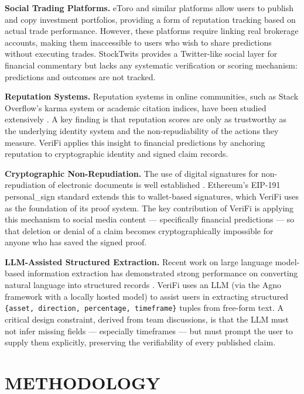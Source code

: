 \documentclass[a4paper,12pt]{report}
\begin{document}
\textbf{Social Trading Platforms.} eToro and similar platforms allow users to publish and copy investment portfolios, providing a form of reputation tracking based on actual trade performance. However, these platforms require linking real brokerage accounts, making them inaccessible to users who wish to share predictions without executing trades. StockTwits provides a Twitter-like social layer for financial commentary but lacks any systematic verification or scoring mechanism: predictions and outcomes are not tracked.

\textbf{Reputation Systems.} Reputation systems in online communities, such as Stack Overflow's karma system or academic citation indices, have been studied extensively \cite{josang2007}. A key finding is that reputation scores are only as trustworthy as the underlying identity system and the non-repudiability of the actions they measure. VeriFi applies this insight to financial predictions by anchoring reputation to cryptographic identity and signed claim records.

\textbf{Cryptographic Non-Repudiation.} The use of digital signatures for non-repudiation of electronic documents is well established \cite{johnson2001}. Ethereum's EIP-191 personal\_sign standard \cite{eip191} extends this to wallet-based signatures, which VeriFi uses as the foundation of its proof system. The key contribution of VeriFi is applying this mechanism to social media content --- specifically financial predictions --- so that deletion or denial of a claim becomes cryptographically impossible for anyone who has saved the signed proof.

\textbf{LLM-Assisted Structured Extraction.} Recent work on large language model-based information extraction has demonstrated strong performance on converting natural language into structured records \cite{wei2022}. VeriFi uses an LLM (via the Agno framework with a locally hosted model) to assist users in extracting structured \texttt{\{asset, direction, percentage, timeframe\}} tuples from free-form text. A critical design constraint, derived from team discussions, is that the LLM must not infer missing fields --- especially timeframes --- but must prompt the user to supply them explicitly, preserving the verifiability of every published claim.

\chapter{METHODOLOGY}
\end{document}
